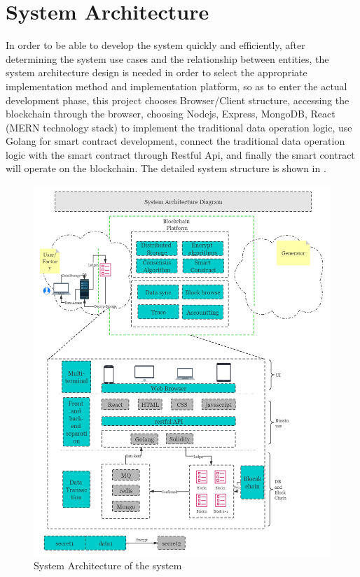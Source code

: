\section{System Architecture}
In order to be able to develop the system quickly and efficiently, after determining the system use cases and the relationship between entities, the system architecture design is needed in order to select the appropriate implementation method and implementation platform, so as to enter the actual development phase, this project chooses Browser/Client structure, accessing the blockchain through the browser, choosing Nodejs, Express, MongoDB, React (MERN technology stack) to implement the traditional data operation logic, use Golang for smart contract development, connect the traditional data operation logic with the smart contract through Restful Api, and finally the smart contract will operate on the blockchain. The detailed system structure is shown in .
\begin{figure}[!htb]
    \centering
    \includegraphics[width=.8\textwidth]{img/Architecture.png}
    \caption{System Architecture of the system}
    \label{fig:sysarchtecture}
\end{figure}


